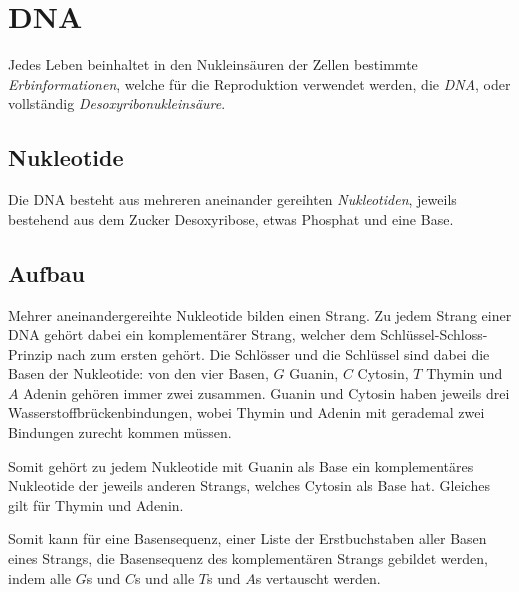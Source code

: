 \documentclass{article}
\begin{document}
\section{DNA} 
Jedes Leben beinhaltet in den Nukleinsäuren der Zellen bestimmte \emph{Erbinformationen}, welche für die Reproduktion verwendet werden, die \emph{DNA}, oder vollständig \emph{Desoxyribonukleinsäure}.
 
\subsection{Nukleotide}
Die DNA besteht aus mehreren aneinander gereihten \emph{Nukleotiden}, jeweils bestehend aus dem Zucker Desoxyribose, etwas Phosphat und eine Base.
 
\subsection{Aufbau}
Mehrer aneinandergereihte Nukleotide bilden einen Strang. Zu jedem Strang einer DNA gehört dabei ein komplementärer Strang, welcher dem Schlüssel-Schloss-Prinzip nach zum ersten gehört. Die Schlösser und die Schlüssel sind dabei die Basen der Nukleotide: von den vier Basen, $G$ Guanin, $C$ Cytosin, $T$ Thymin und $A$ Adenin gehören immer zwei zusammen. Guanin und Cytosin haben jeweils drei Wasserstoffbrückenbindungen, wobei Thymin und Adenin mit gerademal zwei Bindungen zurecht kommen müssen.
 
Somit gehört zu jedem Nukleotide mit Guanin als Base ein komplementäres Nukleotide der jeweils anderen Strangs, welches Cytosin als Base hat. Gleiches gilt für Thymin und Adenin. 
 
Somit kann für eine Basensequenz, einer Liste der Erstbuchstaben aller Basen eines Strangs, die Basensequenz des komplementären Strangs gebildet werden, indem alle $G$s und $C$s und alle $T$s und $A$s vertauscht werden. 
 
\end{document}
